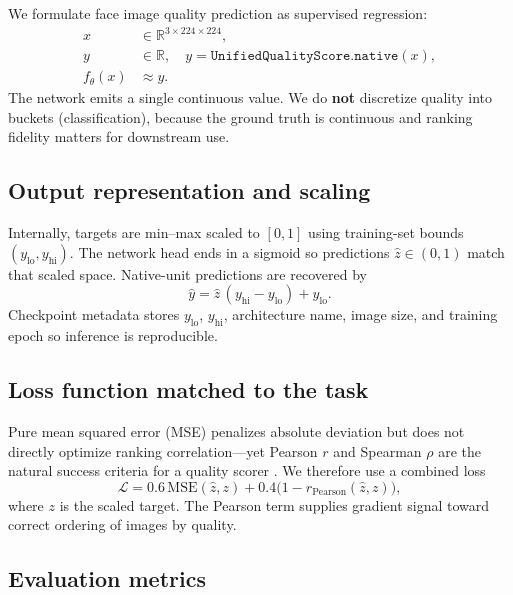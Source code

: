 \documentclass[12pt, letterpaper, titlepage]{article}
\begin{document}
We formulate face image quality prediction as supervised regression:
\begin{align}
x &\in \mathbb{R}^{3\times 224\times 224}, \\
y &\in \mathbb{R}, \quad y = \texttt{UnifiedQualityScore.native}(x), \\
f_\theta(x) &\approx y.
\end{align}
The network emits a single continuous value. We do \textbf{not} discretize quality into buckets (classification), because the ground truth is continuous and ranking fidelity matters for downstream use.

\subsection{Output representation and scaling}

Internally, targets are min--max scaled to $[0,1]$ using training-set bounds $(y_{\mathrm{lo}}, y_{\mathrm{hi}})$. The network head ends in a sigmoid so predictions $\hat{z}\in(0,1)$ match that scaled space. Native-unit predictions are recovered by
\begin{equation}
\hat{y} = \hat{z}\,(y_{\mathrm{hi}}-y_{\mathrm{lo}}) + y_{\mathrm{lo}}.
\label{eq:unscale}
\end{equation}
Checkpoint metadata stores $y_{\mathrm{lo}}$, $y_{\mathrm{hi}}$, architecture name, image size, and training epoch so inference is reproducible.

\subsection{Loss function matched to the task}

Pure mean squared error (MSE) penalizes absolute deviation but does not directly optimize ranking correlation---yet Pearson $r$ and Spearman $\rho$ are the natural success criteria for a quality scorer \citep{pearson1896correlation,spearman1904correlation}. We therefore use a combined loss
\begin{equation}
\mathcal{L} = 0.6\,\mathrm{MSE}(\hat{z}, z) + 0.4\bigl(1 - r_{\mathrm{Pearson}}(\hat{z}, z)\bigr),
\label{eq:loss}
\end{equation}
where $z$ is the scaled target. The Pearson term supplies gradient signal toward correct ordering of images by quality.

\subsection{Evaluation metrics}
\end{document}

